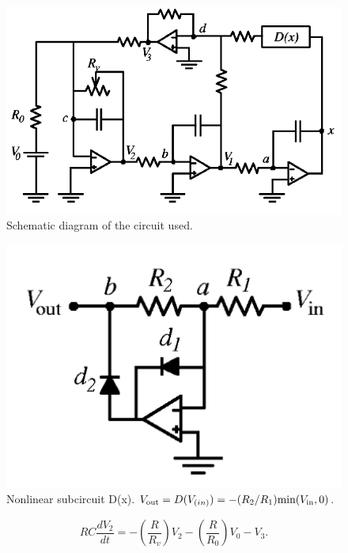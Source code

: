\begin{minipage}{0.60\textwidth}
    \begin{figure}[h]
    \centering
    \includegraphics[width=1\textwidth]{images/e_chaotic_circuit.png}
    \caption{Schematic diagram of the circuit used.}
\end{figure}
\end{minipage}
\hfill
\begin{minipage}{0.35\textwidth}
    \begin{figure}[h]
        \centering
        \includegraphics[width=1\textwidth]{images/e_nonlinear_elements.png}
        \caption{Nonlinear subcircuit D(x). $V_{\text{out}} = D (V_{\text(in)}) = -(R_2/R_1)\text{min}(V_{\text{in}}, 0)$.}
    \end{figure}
    
\end{minipage}
\begin{equation}
    R C \frac{d V_2}{d t} = - \left(\frac{R}{R_v}\right)V_2 - \left(\frac{R}{R_0}\right)V_0 - V_3.
\end{equation}